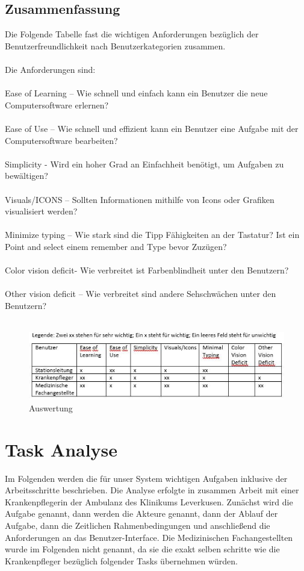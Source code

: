 \documentclass[11pt,
paper=a4,
bibtotocnumbered,	  %
liststotocnumbered,  %
DIV=calc,		  %
tablecaptionabove,	  %
headinclude,
]{article}
\begin{document}
\subsection{Zusammenfassung}
Die Folgende Tabelle fast die wichtigen Anforderungen bezüglich der Benutzerfreundlichkeit nach Benutzerkategorien zusammen.\\\\
Die Anforderungen sind:\\\\
Ease of Learning – Wie schnell und einfach kann ein Benutzer die neue Computersoftware erlernen?\\\\
Ease of Use – Wie schnell und effizient kann ein Benutzer eine Aufgabe mit der Computersoftware bearbeiten?\\\\
Simplicity - Wird ein hoher Grad an Einfachheit benötigt, um Aufgaben zu bewältigen?\\\\
Visuals/ICONS – Sollten Informationen mithilfe von Icons oder Grafiken visualisiert werden?\\\\
Minimize typing – Wie stark sind die Tipp Fähigkeiten an der Tastatur? Ist ein Point and select einem remember and Type bevor Zuzügen?\\\\
Color vision deficit- Wie verbreitet ist Farbenblindheit unter den Benutzern?\\\\
Other vision deficit – Wie verbreitet sind andere Sehschwächen unter den Benutzern?\\\\
\begin{figure}[H]
\includegraphics[width=1\textwidth]{Bilder/tabelleAuswert.jpg}
\caption{Auswertung}
\end{figure}
\section{Task Analyse}
Im Folgenden werden die für unser System wichtigen Aufgaben inklusive der Arbeitsschritte beschrieben. Die Analyse erfolgte in zusammen Arbeit mit einer Krankenpflegerin der Ambulanz des Klinikums Leverkusen. Zunächst wird die Aufgabe genannt, dann werden die Akteure genannt, dann der Ablauf der Aufgabe, dann die Zeitlichen Rahmenbedingungen und anschließend die Anforderungen an das Benutzer-Interface. Die Medizinischen Fachangestellten wurde im Folgenden nicht genannt, da sie die exakt selben schritte wie die Krankenpfleger bezüglich folgender Tasks übernehmen würden.
\end{document}
